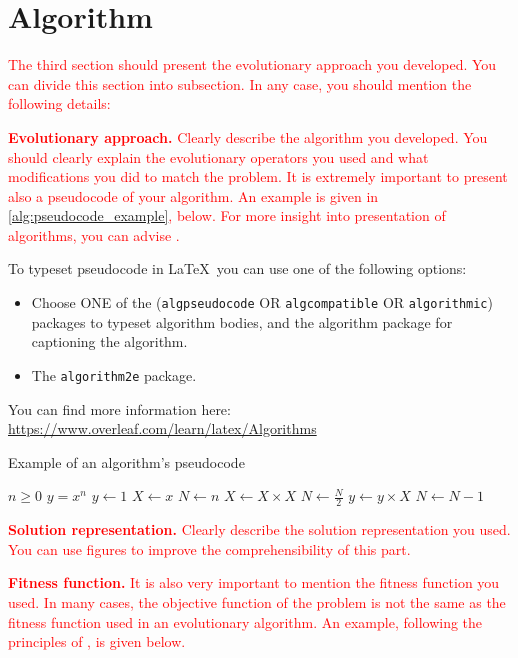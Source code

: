 \section{Algorithm}
\label{sec:algorithm}

\textcolor{red}{The third section should present the evolutionary approach you developed. You can divide this section into subsection. In any case, you should mention the following details:}

\textcolor{red}{\textbf{Evolutionary approach.} Clearly describe the algorithm you developed. You should clearly explain the evolutionary operators you used and what modifications you did to match the problem. It is extremely important to present also a pseudocode of your algorithm. An example is given in \ref{alg:pseudocode_example}, below. For more insight into presentation of algorithms, you can advise \cite{zobel2014algorithms}.}

{
\color{red}To typeset pseudocode in \LaTeX\ you can use one of the following options:
\begin{itemize}
    \item Choose ONE of the (\texttt{algpseudocode} OR \texttt{algcompatible} OR \texttt{algorithmic}) packages to typeset algorithm bodies, and the algorithm package for captioning the algorithm.
    \item The \texttt{algorithm2e} package.
\end{itemize}
You can find more information here: \url{https://www.overleaf.com/learn/latex/Algorithms}
}

\begin{algorithm}
\caption{Example of an algorithm's pseudocode}\label{alg:pseudocode_example}
\begin{algorithmic}
\Require $n \geq 0$
\Ensure $y = x^n$
\State $y \gets 1$
\State $X \gets x$
\State $N \gets n$
    \State $X \gets X \times X$
    \State $N \gets \frac{N}{2}$  
    \State $y \gets y \times X$
    \State $N \gets N - 1$
\EndIf
\EndWhile
\end{algorithmic}
\end{algorithm}

\textcolor{red}{\textbf{Solution representation.} Clearly describe the solution representation you used. You can use figures to improve the comprehensibility of this part.}

\textcolor{red}{\textbf{Fitness function.} It is also very important to mention the fitness function you used. In many cases, the objective function of the problem is not the same as the fitness function used in an evolutionary algorithm. An example, following the principles of \cite{zobel2014mathematics}, is given below.}

